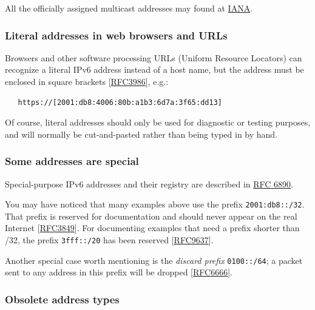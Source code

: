 \documentclass[
]{article}
\begin{document}
All the officially assigned multicast addresses may found at
\href{https://www.iana.org/assignments/ipv6-multicast-addresses/ipv6-multicast-addresses.xhtml\#link-local}{IANA}.

\subsubsection{Literal addresses in web browsers and
URLs}\label{literal-addresses-in-web-browsers-and-urls}

Browsers and other software processing URLs (Uniform Resource Locators)
can recognize a literal IPv6 address instead of a host name, but the
address must be enclosed in square brackets
{[}\href{https://www.rfc-editor.org/info/rfc3986}{RFC3986}{]}, e.g.:

\begin{verbatim}
   https://[2001:db8:4006:80b:a1b3:6d7a:3f65:dd13]
\end{verbatim}

Of course, literal addresses should only be used for diagnostic or
testing purposes, and will normally be cut-and-pasted rather than being
typed in by hand.

\subsubsection{Some addresses are
special}\label{some-addresses-are-special}

Special-purpose IPv6 addresses and their registry are described in
\href{https://www.rfc-editor.org/info/rfc6890}{RFC 6890}.

You may have noticed that many examples above use the prefix
\texttt{2001:db8::/32}. That prefix is reserved for documentation and
should never appear on the real Internet
{[}\href{https://www.rfc-editor.org/info/rfc3849}{RFC3849}{]}. For
documenting examples that need a prefix shorter than /32, the prefix
\texttt{3fff::/20} has been reserved
{[}\href{https://www.rfc-editor.org/info/rfc9637}{RFC9637}{]}.

Another special case worth mentioning is the \emph{discard prefix}
\texttt{0100::/64}; a packet sent to any address in this prefix will be
dropped {[}\href{https://www.rfc-editor.org/info/rfc6666}{RFC6666}{]}.

\subsubsection{Obsolete address types}\label{obsolete-address-types}
\end{document}
